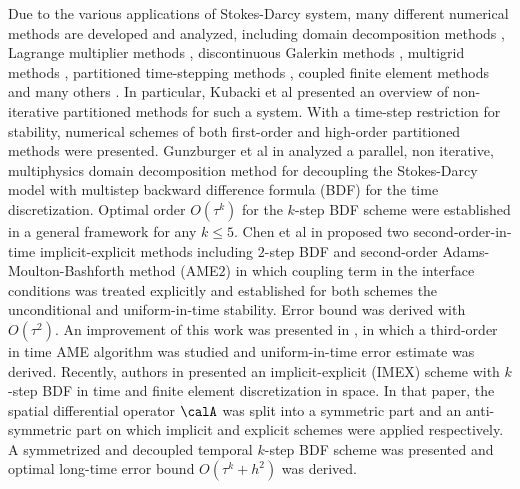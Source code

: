 Due to the various applications of Stokes-Darcy system, many different numerical methods are developed and analyzed, including domain decomposition methods \cite{DiscacciatiQuarteroni:2004,BoubendirTlupova:2013,CaoGunzburger:2011,ChenGunzburger:2011,DiscacciatiMiglio:2002,DiscacciatiQuarteroni:2007,FengHeWangZhang:2012,GunzburgerHeLi:2018,VassilevWangYotov:2014,QiuHeLiLin:2020}, Lagrange multiplier methods \cite{LaytonFriedhelmYotov:2003,BabuskaGatica:2010,GaticaMeddahiOyarzua:2008,HuangChenCai:2012}, discontinuous Galerkin methods \cite{KanschatRiviere:2010,LipnikovVassilevYotov:2014,Riviere:2005,RiviereYotov:2005}, multigrid methods \cite{ArbogastGomez:2009,MuXu:2008}, partitioned time-stepping methods \cite{KubackiMoraiti:2015,MuZhu:2010,ShanZheng:2013,ZhangRuiCao:2019}, coupled finite element methods \cite{CaoGunzburgerHu:2010,CamanoGatica:2015,KarperMardalWinther:2009,MarquezMeddahiSayas:2015} and many others \cite{ChenGunzburger:2016,ChenGunzburger:2013,GiraultVassilevYotov:2014,HeJiangQiu:2020}. In particular, 
Kubacki et al \cite{KubackiTran:2017} presented an overview of non-iterative partitioned methods for such a system. With a time-step restriction for stability, numerical schemes of both first-order and high-order partitioned methods were presented. Gunzburger et al in \cite{GunzburgerHeLi:2018} analyzed a parallel, non iterative, multiphysics domain decomposition method for decoupling the Stokes-Darcy model with multistep backward difference formula (BDF) for the time discretization. Optimal order $O(\tau^k)$ for the $k$-step BDF scheme were established in a general framework for any $k\le5$.
Chen et al in \cite{ChenGunzburger:2013} proposed two second-order-in-time implicit-explicit methods including $2$-step BDF and second-order Adams-Moulton-Bashforth method (AME$2$) in which coupling term in the interface conditions was treated explicitly and established for both schemes the unconditional and uniform-in-time stability. Error bound was derived with $O(\tau^2)$.  An improvement of this work was presented in \cite{ChenGunzburger:2016}, in  which a third-order in time AME algorithm was studied and uniform-in-time error estimate was derived.
Recently, authors in \cite{LiWangZhou:2020} presented an implicit-explicit (IMEX) scheme with $k$-step BDF in time and finite element discretization in space. In that paper, the spatial differential operator $\calA$ was split into a symmetric part and an anti-symmetric part on which implicit and explicit schemes were applied respectively. A symmetrized and decoupled temporal $k$-step BDF scheme was presented and optimal long-time error bound $O(\tau^k+h^2)$ was derived.

